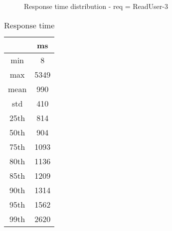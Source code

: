 \begin{minipage}{0.75\linewidth}
\begin{figure}[h]
\begin{adjustbox}{max width=1.0\linewidth, keepaspectratio}
  \end{adjustbox}
  \caption{Response time distribution - req = ReadUser-3}
\end{figure}
\end{minipage}\hfill\begin{minipage}{0.18\linewidth}
\begin{table}[h]
\begin{tabular}{|cc|}
\hline
\textbf{} & \textbf{ms}\\ \hline
 \Xhline{0.005\arrayrulewidth}
min & 8\\
 \Xhline{0.005\arrayrulewidth}
max & 5349\\
 \Xhline{0.005\arrayrulewidth}
mean & 990\\
 \Xhline{0.005\arrayrulewidth}
std & 410\\
\hline
\hline
 \Xhline{0.005\arrayrulewidth}
25th & 814\\
 \Xhline{0.005\arrayrulewidth}
50th & 904\\
 \Xhline{0.005\arrayrulewidth}
75th & 1093\\
 \Xhline{0.005\arrayrulewidth}
80th & 1136\\
 \Xhline{0.005\arrayrulewidth}
85th & 1209\\
 \Xhline{0.005\arrayrulewidth}
90th & 1314\\
 \Xhline{0.005\arrayrulewidth}
95th & 1562\\
 \Xhline{0.005\arrayrulewidth}
99th & 2620\\
\hline
\end{tabular}
\caption{Response time}
\end{table}
\end{minipage}\hfill